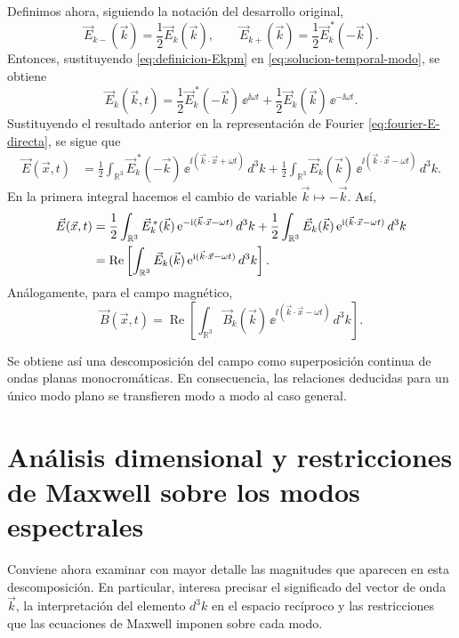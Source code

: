 \documentclass[../main.tex]{subfiles}
\begin{document}
Definimos ahora, siguiendo la notación del desarrollo original,
\begin{equation}
    \vec E_{k-}(\vec k)=\frac{1}{2}\vec E_k(\vec k),
    \qquad
    \vec E_{k+}(\vec k)=\frac{1}{2}\vec E_k^{\,*}(-\vec k).
    \label{eq:definicion-Ekpm}
\end{equation}
Entonces, sustituyendo \eqref{eq:definicion-Ekpm} en \eqref{eq:solucion-temporal-modo}, se obtiene
\begin{equation*}
    \vec E_k(\vec k,t)=\frac{1}{2}\vec E_k^{\,*}(-\vec k)\,\ee^{\ii\omega t}+\frac{1}{2}\vec E_k(\vec k)\,\ee^{-\ii\omega t}.
\end{equation*}
Sustituyendo el resultado anterior en la representación de Fourier \eqref{eq:fourier-E-directa}, se sigue que
\begin{align*}
    \vec E(\vec x,t)
    &=\frac{1}{2}\int_{\mathbb R^3}\vec E_k^{\,*}(-\vec k)\,\ee^{\ii(\vec k\cdot\vec x+\omega t)}\,d^3k
      +\frac{1}{2}\int_{\mathbb R^3}\vec E_k(\vec k)\,\ee^{\ii(\vec k\cdot\vec x-\omega t)}\,d^3k.
\end{align*}
En la primera integral hacemos el cambio de variable $\vec k\mapsto -\vec k$. Así,
\begin{align*}
    \vec E(\vec x,t)
    &=\frac{1}{2}\int_{\mathbb R^3}\vec E_k^{\,*}(\vec k)\,\mathrm{e}^{-\mathrm{i}(\vec k\cdot\vec x-\omega t)}\,d^3k
      +\frac{1}{2}\int_{\mathbb R^3}\vec E_k(\vec k)\,\mathrm{e}^{\mathrm{i}(\vec k\cdot\vec x-\omega t)}\,d^3k 
\notag\\
    &=\operatorname{Re}\left[\int_{\mathbb R^3}\vec E_k(\vec k)\,\mathrm{e}^{\mathrm{i}(\vec k\cdot\vec x-\omega t)}\,d^3k\right].
\end{align*}
Análogamente, para el campo magnético,
\begin{equation*}
    \vec B(\vec x,t)=\operatorname{Re}\left[\int_{\mathbb R^3}\vec B_k(\vec k)\,\ee^{\ii(\vec k\cdot\vec x-\omega t)}\,d^3k\right].
\end{equation*}

Se obtiene así una descomposición del campo como superposición continua de ondas planas monocromáticas. En consecuencia, las relaciones deducidas para un único modo plano se transfieren modo a modo al caso general.

\section{Análisis dimensional y restricciones de Maxwell sobre los modos espectrales}

Conviene ahora examinar con mayor detalle las magnitudes que aparecen en esta descomposición. En particular, interesa precisar el significado del vector de onda $\vec k$, la interpretación del elemento $d^3k$ en el espacio recíproco y las restricciones que las ecuaciones de Maxwell imponen sobre cada modo.
\end{document}
